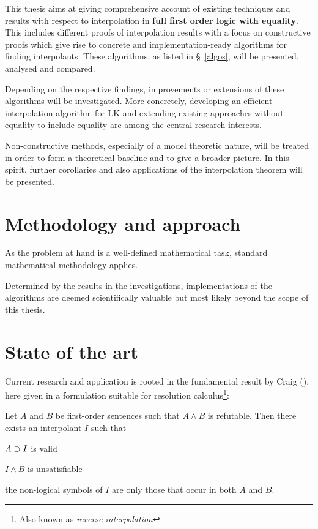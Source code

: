\documentclass[,%
			paper=a4,%
			DIV10,
			liststotoc,
			bibtotoc,
			draft=false,%
			numbers=noendperiod
			]{scrartcl}
\begin{document}
This thesis aims at giving comprehensive account of existing techniques and results with respect to interpolation in \textbf{full first order logic with equality}.
This includes different proofs of interpolation results with a focus on constructive proofs which give rise to concrete and implementation-ready algorithms for finding interpolants.
These algorithms, as listed in \S~\ref{algos}, will be presented, analysed and compared. 

Depending on the respective findings, improvements or extensions of these algorithms will be investigated.
More concretely, developing an efficient interpolation algorithm for LK and extending existing approaches without equality to include equality are among the central research interests.

Non-constructive methods, especially of a model theoretic nature, will be treated in order to form a theoretical baseline and to give a broader picture.
In this spirit, further corollaries and also applications of the interpolation theorem will be presented.



\section{Methodology and approach}

As the problem at hand is a well-defined mathematical task, standard mathematical methodology applies.

Determined by the results in the investigations, implementations of the algorithms are deemed scientifically valuable but most likely beyond the scope of this thesis.


\section{State of the art}

Current research and application is rooted in the fundamental result by Craig (\cite{craig57linear}), here given in a formulation suitable for resolution calculus\footnote{Also known as \emph{reverse interpolation}}:

\begin{samepage}
\begin{thm}[Interpolation]
	Let $A$ and $B$ be first-order sentences such that $ A \land B $ is refutable. 
	Then there exists an interpolant $I$ such that \nopagebreak[4]
	\begin{compactenum}
		\item $ A \supset I$ is valid 
		\item $I \land B$ is unsatisfiable
		\item the non-logical symbols of $I$ are only those that occur in both $A$ and $B$. \qedhere
	\end{compactenum}
\end{thm}
\end{samepage}
\end{document}
